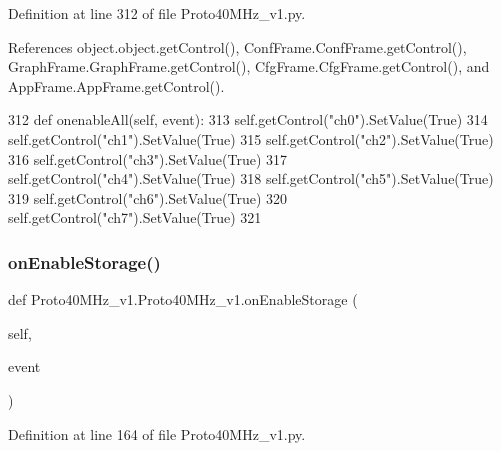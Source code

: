 Definition at line 312 of file Proto40\+M\+Hz\+\_\+v1.\+py.



References object.\+object.\+get\+Control(), Conf\+Frame.\+Conf\+Frame.\+get\+Control(), Graph\+Frame.\+Graph\+Frame.\+get\+Control(), Cfg\+Frame.\+Cfg\+Frame.\+get\+Control(), and App\+Frame.\+App\+Frame.\+get\+Control().


\begin{DoxyCode}
312     \textcolor{keyword}{def }onenableAll(self, event):
313         self.getControl(\textcolor{stringliteral}{"ch0"}).SetValue(\textcolor{keyword}{True})
314         self.getControl(\textcolor{stringliteral}{"ch1"}).SetValue(\textcolor{keyword}{True})
315         self.getControl(\textcolor{stringliteral}{"ch2"}).SetValue(\textcolor{keyword}{True})
316         self.getControl(\textcolor{stringliteral}{"ch3"}).SetValue(\textcolor{keyword}{True})
317         self.getControl(\textcolor{stringliteral}{"ch4"}).SetValue(\textcolor{keyword}{True})
318         self.getControl(\textcolor{stringliteral}{"ch5"}).SetValue(\textcolor{keyword}{True})
319         self.getControl(\textcolor{stringliteral}{"ch6"}).SetValue(\textcolor{keyword}{True})
320         self.getControl(\textcolor{stringliteral}{"ch7"}).SetValue(\textcolor{keyword}{True})
321 
\end{DoxyCode}
\mbox{\label{classProto40MHz__v1_1_1Proto40MHz__v1_a504affc7cfd2238410d8856a670415c2}} 
\subsubsection{\texorpdfstring{on\+Enable\+Storage()}{onEnableStorage()}}
{\footnotesize\ttfamily def Proto40\+M\+Hz\+\_\+v1.\+Proto40\+M\+Hz\+\_\+v1.\+on\+Enable\+Storage (\begin{DoxyParamCaption}\item[{}]{self,  }\item[{}]{event }\end{DoxyParamCaption})}



Definition at line 164 of file Proto40\+M\+Hz\+\_\+v1.\+py.



